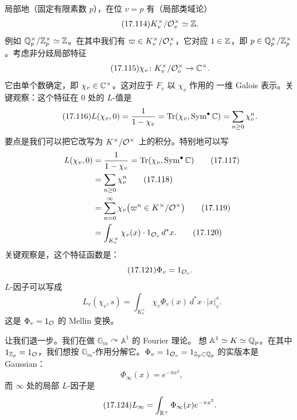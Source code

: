 局部地（固定有限素数 $p$），在位 $v=p$ 有（局部类域论）
\begin{equation}\tag{17.114}\label{eq:17.114}
K_v^{\times}/\mathcal{O}_v^{\times}\simeq\mathbb{Z}.
\end{equation}
例如 $\mathbb{Q}_p^{\times}/\mathbb{Z}_p^{\times}\simeq\mathbb{Z}$。在其中我们有
$\varpi\in K_v^{\times}/\mathcal{O}_v^{\times}$，它对应 $1\in\mathbb{Z}$，即
$p\in\mathbb{Q}_p^{\times}/\mathbb{Z}_p^{\times}$。考虑非分歧局部特征
\begin{equation}\tag{17.115}\label{eq:17.115}
\chi_v\colon K_v^{\times}/\mathcal{O}_v^{\times}\to\mathbb{C}^{\times}.
\end{equation}
它由单个数确定，即 $\chi_v\in\mathbb{C}^{\times}$。这对应于 $F_v$ 以 $\chi_v$ 作用的
一维 Galois 表示。关键观察：这个特征在 $0$ 处的 $L$-值是
\begin{equation}\tag{17.116}\label{eq:17.116}
L(\chi_v,0)=\frac{1}{1-\chi_v}
=\operatorname{Tr}(\chi_v,\operatorname{Sym}^{\bullet}\mathbb{C})
=\sum_{n\ge 0}\chi_v^n.
\end{equation}
要点是我们可以把它改写为 $K^{\times}/\mathcal{O}^{\times}$ 上的积分。特别地可以写
\begin{align}
L(\chi_v,0)&=\frac{1}{1-\chi_v}
=\operatorname{Tr}(\chi_v,\operatorname{Sym}^{\bullet}\mathbb{C})\tag{17.117}\label{eq:17.117}\\
&=\sum_{n\ge 0}\chi_v^n\tag{17.118}\label{eq:17.118}\\
&=\sum_{n=0}^{\infty}\chi_v\bigl(\varpi^n\in K^{\times}/\mathcal{O}^{\times}\bigr)\tag{17.119}\label{eq:17.119}\\
&=\int_{K_v^{\times}}\chi_v(x)\cdot1_{\mathcal{O}_v}\,d^*x.\tag{17.120}\label{eq:17.120}
\end{align}
关键观察是，这个特征函数是：
\begin{equation}\tag{17.121}\label{eq:17.121}
\Phi_v=1_{\mathcal{O}_v}.
\end{equation}
$L$-因子可以写成
\begin{equation}\tag{17.122}\label{eq:17.122}
L_v(\chi_v,s)=\int_{K_v^{\times}}\chi_v\Phi_v(x)\,d^*x\cdot|x|_v^s.
\end{equation}
这是 $\Phi_v=1_{\mathcal{O}}$ 的 Mellin 变换。

让我们退一步。我们在做 $\mathbb G_m\curvearrowright\mathbb A^1$ 的 Fourier 理论。
想 $\mathbb A^1\simeq K\simeq\mathbb{Q}_p$。在其中 $1_{\mathbb{Z}_p}=1_{\mathcal{O}}$，我们想按
$\mathbb G_m$-作用分解它。$\Phi_v=1_{\mathcal{O}_v}=1_{\mathbb{Z}_p\subset\mathbb{Q}_p}$ 的实版本是 Gaussian：
\begin{equation}\tag{17.123}\label{eq:17.123}
\Phi_{\infty}(x)=e^{-\pi x^2},
\end{equation}
而 $\infty$ 处的局部 $L$-因子是
\begin{equation}\tag{17.124}\label{eq:17.124}
L_{\infty}=\int_{\mathbb{R}^{\times}}\Phi_{\infty}(x)e^{-\pi x^2}.
\end{equation}

